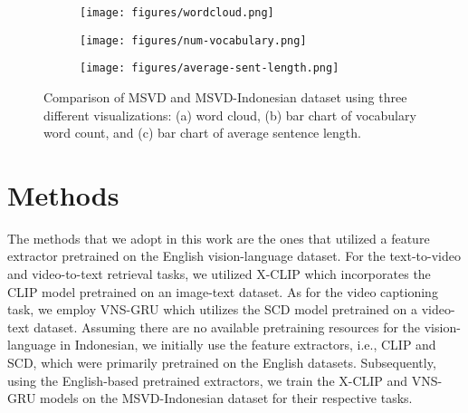 \documentclass{article}
\begin{document}
\begin{figure}[htbp]
  \centering
  \begin{subfigure}[b]{0.8\textwidth}
    \centering
    \texttt{[image: figures/wordcloud.png]}
    \caption{}
    \label{fig:wordcloud}
  \end{subfigure}
  
  \vspace{\baselineskip}
  
  \begin{subfigure}[b]{0.45\textwidth}
    \centering
    \texttt{[image: figures/num-vocabulary.png]}
    \caption{}
    \label{fig:image2}
  \end{subfigure}
  \hfill
  \begin{subfigure}[b]{0.45\textwidth}
    \centering
    \texttt{[image: figures/average-sent-length.png]}
    \caption{}
    \label{fig:image3}
  \end{subfigure}
  
  \caption{Comparison of MSVD and MSVD-Indonesian dataset using three different visualizations: (a) word cloud, (b) bar chart of vocabulary word count, and (c) bar chart of average sentence length.}
  \label{fig:dataset-analysis}
\end{figure}

\section{Methods}

The methods that we adopt in this work are the ones that utilized a feature extractor pretrained on the English vision-language dataset. For the text-to-video and video-to-text retrieval tasks, we utilized X-CLIP \cite{10.1145/3503161.3547910} which incorporates the CLIP \cite{Radford2021LearningTV} model pretrained on an image-text dataset. As for the video captioning task, we employ VNS-GRU \cite{DBLP:conf/ecai/Chen0020a} which utilizes the SCD \cite{SCN_CVPR2017} model pretrained on a video-text dataset. Assuming there are no available pretraining resources for the vision-language in Indonesian, we initially use the feature extractors, i.e., CLIP and SCD, which were primarily pretrained on the English datasets. Subsequently, using the English-based pretrained extractors, we train the X-CLIP and VNS-GRU models on the MSVD-Indonesian dataset for their respective tasks.
\end{document}
